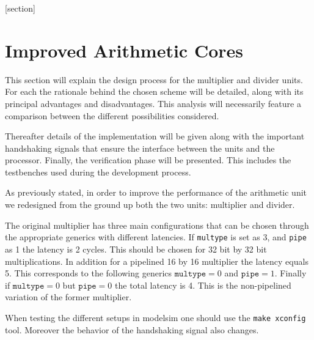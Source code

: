 \newcommand{\ov}[1]{\overline{#1}}
[section]
\newcommand{\unaryminus}{\scalebox{0.5}[1.0]{\( - \)}}
\newcommand{\AND}{\texttt{AND}\xspace}
\newcommand{\RST}{\texttt{RST}\xspace}
\newcommand{\CLK}{\texttt{CLK}\xspace}
\newcommand{\HOLDN}{\texttt{HOLDN}\xspace}
\newcommand{\MULI}{\texttt{MULI}\xspace}
\newcommand{\MULO}{\texttt{MULO}\xspace}
\newcommand{\infer}{\texttt{infer}\xspace}
\newcommand{\multype}{\texttt{multype}\xspace}
\newcommand{\pipe}{\texttt{pipe}\xspace}
\newcommand{\mac}{\texttt{mac}\xspace}
\newcommand{\ready}{\texttt{ready}\xspace}
\newcommand{\start}{\texttt{start}\xspace}
\newcommand{\holdn}{\texttt{holdn}\xspace}
\newcommand{\nready}{\texttt{nready}\xspace}
\newcommand{\STDV}{\texttt{STD\_LOGIC\_VECTOR}\xspace}



\section{Improved Arithmetic Cores}
\label{sec:arth}

This section will explain the design process for the multiplier and divider units.
For each the rationale behind the chosen scheme will be detailed, along with its principal advantages and disadvantages.
This analysis will necessarily feature a comparison between the different possibilities considered.

Thereafter details of the implementation will be given along with the important handshaking signals that ensure the interface between the units and the processor. Finally, the verification phase will be presented. This includes the testbenches used during the development process.

As previously stated, in order to improve the performance of the arithmetic unit we redesigned from the ground up both the
two units: multiplier and divider.

The original multiplier has three main configurations that can be chosen through the appropriate generics with different latencies. 
If \multype is set as 3, and \pipe as 1 the latency is 2 cycles. This should be chosen for 32 bit by 32 bit multiplications.
In addition for a pipelined 16 by 16 multiplier the latency equals 5. This corresponds to the following generics $\multype = 0$ and $\pipe = 1$.
Finally if $\multype = 0$ but $\pipe = 0$ the total latency is 4. This is the non-pipelined variation of the former multiplier.

When testing the different setups in modelsim one should use the \texttt{make xconfig} tool.
Moreover the behavior of the handshaking signal also changes.

